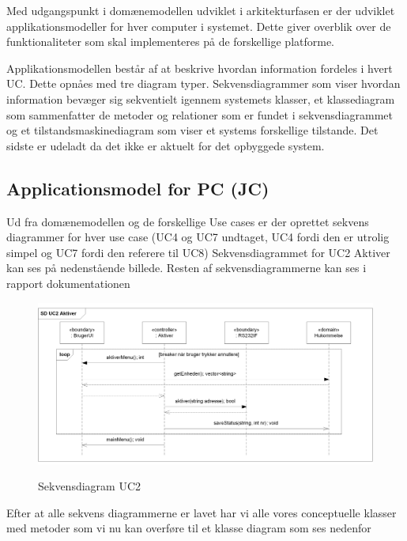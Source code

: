 Med udgangspunkt i domænemodellen udviklet i arkitekturfasen er der udviklet applikationsmodeller for hver computer i systemet. Dette giver overblik over de funktionaliteter som skal implementeres på de forskellige platforme.

Applikationsmodellen består af at beskrive hvordan information fordeles i hvert UC. Dette opnåes med tre diagram typer. Sekvensdiagrammer som viser hvordan information bevæger sig sekventielt igennem systemets klasser, et klassediagram som sammenfatter de metoder og relationer som er fundet i sekvensdiagrammet og et tilstandsmaskinediagram som viser et systems forskellige tilstande. Det sidste er udeladt da det ikke er aktuelt for det opbyggede system.

\subsection{Applicationsmodel for PC (JC)}

Ud fra domænemodellen og de forskellige Use cases er der oprettet sekvens diagrammer for hver use case (UC4 og UC7 undtaget, UC4 fordi den er utrolig simpel og UC7 fordi den referere til UC8) Sekvensdiagrammet for UC2 Aktiver kan ses på nedenstående billede. Resten af sekvensdiagrammerne kan ses i rapport dokumentationen

\begin{figure}[htbp] \centering
{\includegraphics[width=\textwidth]{billeder/uml/PC_UC2}}
\caption{Sekvensdiagram UC2}
\label{lab:Sekvensdiagram UC2}
\end{figure}

Efter at alle sekvens diagrammerne er lavet har vi alle vores conceptuelle klasser med metoder som vi nu kan overføre til et klasse diagram som ses nedenfor

